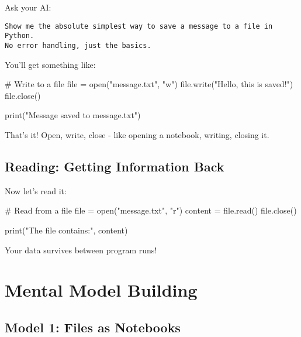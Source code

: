 \documentclass[
  letterpaper,
  DIV=11,
  numbers=noendperiod,
  oneside]{scrreprt}
\newenvironment{Shaded}{}{}
\newcommand{\BuiltInTok}[1]{\textcolor[rgb]{0.84,0.23,0.29}{#1}}
\newcommand{\CommentTok}[1]{\textcolor[rgb]{0.42,0.45,0.49}{#1}}
\newcommand{\NormalTok}[1]{\textcolor[rgb]{0.14,0.16,0.18}{#1}}
\newcommand{\OperatorTok}[1]{\textcolor[rgb]{0.14,0.16,0.18}{#1}}
\newcommand{\StringTok}[1]{\textcolor[rgb]{0.01,0.18,0.38}{#1}}
\begin{document}
Ask your AI:

\begin{verbatim}
Show me the absolute simplest way to save a message to a file in Python. 
No error handling, just the basics.
\end{verbatim}

You'll get something like:

\begin{Shaded}
\begin{Highlighting}[]
\CommentTok{\# Write to a file}
\BuiltInTok{file} \OperatorTok{=} \BuiltInTok{open}\NormalTok{(}\StringTok{"message.txt"}\NormalTok{, }\StringTok{"w"}\NormalTok{)}
\BuiltInTok{file}\NormalTok{.write(}\StringTok{"Hello, this is saved!"}\NormalTok{)}
\BuiltInTok{file}\NormalTok{.close()}

\BuiltInTok{print}\NormalTok{(}\StringTok{"Message saved to message.txt"}\NormalTok{)}
\end{Highlighting}
\end{Shaded}

That's it! Open, write, close - like opening a notebook, writing,
closing it.

\subsection{Reading: Getting Information
Back}\label{reading-getting-information-back}

Now let's read it:

\begin{Shaded}
\begin{Highlighting}[]
\CommentTok{\# Read from a file}
\BuiltInTok{file} \OperatorTok{=} \BuiltInTok{open}\NormalTok{(}\StringTok{"message.txt"}\NormalTok{, }\StringTok{"r"}\NormalTok{)}
\NormalTok{content }\OperatorTok{=} \BuiltInTok{file}\NormalTok{.read()}
\BuiltInTok{file}\NormalTok{.close()}

\BuiltInTok{print}\NormalTok{(}\StringTok{"The file contains:"}\NormalTok{, content)}
\end{Highlighting}
\end{Shaded}

Your data survives between program runs!

\section{Mental Model Building}\label{mental-model-building-7}

\subsection{Model 1: Files as
Notebooks}\label{model-1-files-as-notebooks}
\end{document}
